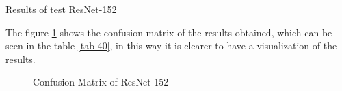 \documentclass[letterpaper,12pt,openright,oneside]{article}
\begin{document}
\begin{table}[H]
\centerline{}
\caption{Results of test ResNet-152 }
\label{tab 40}
\end{table}

The figure \ref{fig 105} shows the confusion matrix of the results obtained, which can be seen in the table \ref{tab 40}, in this way it is clearer to have a visualization of the results.\\

\begin{figure}[H]
\centerline{}
\caption{Confusion Matrix of ResNet-152}
\label{fig 105}
\end{figure}






\end{document}
